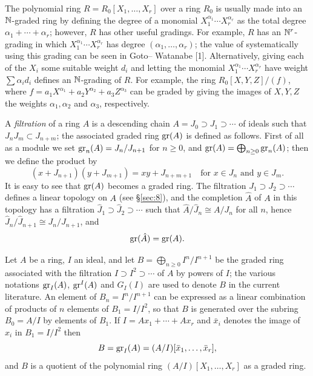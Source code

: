 The polynomial ring $R = R_0[X_1, \ldots, X_r]$ over a ring $R_0$ is usually made
into an $\mathbb{N}$-graded ring by defining the degree of a monomial $X_1^{\alpha_1} \cdots X_r^{\alpha_r}$ as
the total degree $\alpha_1 + \cdots + \alpha_r$; however, $R$ has other useful gradings. For
example, $R$ has an $\mathbb{N}^r$-grading in which $X_1^{\alpha_1} \cdots X_r^{\alpha_r}$ has degree $(\alpha_1, \ldots, \alpha_r)$;
the value of systematically using this grading can be seen in Goto--
Watanabe [1]. Alternatively, giving each of the $X_i$ some suitable weight
$d_i$ and letting the monomial $X_1^{\alpha_1} \cdots X_r^{\alpha_r}$ have weight $\sum \alpha_i d_i$ defines an
$\mathbb{N}$-grading of $R$. For example, the ring $R_0[X, Y, Z]/(f)$, where $f = a_1X^{\alpha_1} +
a_2Y^{\alpha_2} + a_3Z^{\alpha_3}$ can be graded by giving the images of $X, Y, Z$ the weights
$\alpha_1, \alpha_2$ and $\alpha_3$, respectively.

A \emph{filtration} of a ring $A$ is a descending chain $A = J_0 \supset J_1 \supset \cdots$ of ideals
such that $J_nJ_m \subset J_{n+m}$; the associated graded ring $\operatorname{gr}(A)$ is defined as
follows. First of all as a module we set $\operatorname{gr}_n(A) = J_n/J_{n+1}$ for $n \ge 0$, and
$\operatorname{gr}(A) = \bigoplus_{n \ge 0} \operatorname{gr}_n(A)$; then we define the product by
\[
  (x + J_{n+1})(y + J_{m+1}) = xy + J_{n+m+1} \quad \text{for } x \in J_n \text{ and } y \in J_m.
\]
It is easy to see that $\operatorname{gr}(A)$ becomes a graded ring. The filtration
$J_1 \supset J_2 \supset \cdots$ defines a linear topology on $A$ (see \S\ref{sec:8}), and the completion $\hat{A}$ of
$A$ in this topology has a filtration $\hat{J}_1 \supset \hat{J}_2 \supset \cdots$ such that $\hat{A}/\hat{J}_n \cong A/J_n$ for
all $n$, hence $\hat{J}_n/\hat{J}_{n+1} \cong J_n/J_{n+1}$, and
\[
  \operatorname{gr}(\hat{A}) = \operatorname{gr}(A).
\]

Let $A$ be a ring, $I$ an ideal, and let $B = \bigoplus_{n \ge 0} I^n/I^{n+1}$ be the graded ring
associated with the filtration $I \supset I^2 \supset \cdots$ of $A$ by powers of $I$; the various
notations $\operatorname{gr}_I(A)$, $\operatorname{gr}^I(A)$ and $G_I(I)$ are used to denote $B$ in the current
literature. An element of $B_n = I^n/I^{n+1}$ can be expressed as a linear
combination of products of $n$ elements of $B_1 = I/I^2$, so that $B$ is generated
over the subring $B_0 = A/I$ by elements of $B_1$. If $I = Ax_1 + \cdots + Ax_r$ and $\bar{x}_i$
denotes the image of $x_i$ in $B_1 = I/I^2$ then
\[
  B = \operatorname{gr}_I(A) = (A/I)[\bar{x}_1, \ldots, \bar{x}_r],
\]
and $B$ is a quotient of the polynomial ring $(A/I)[X_1, \ldots, X_r]$ as a graded
ring.

